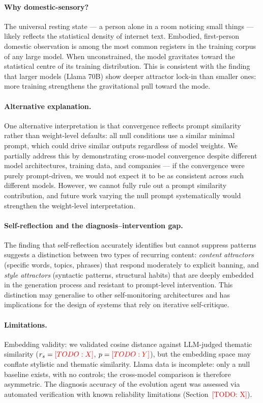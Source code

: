 \documentclass{article}
\newcommand{\todo}[1]{\textcolor{red}{[TODO: #1]}}
\begin{document}
\paragraph{Why domestic-sensory?}
The universal resting state --- a person alone in a room noticing small things
--- likely reflects the statistical density of internet text. Embodied,
first-person domestic observation is among the most common registers in the
training corpus of any large model. When unconstrained, the model gravitates
toward the statistical centre of its training distribution. This is consistent
with the finding that larger models (Llama 70B) show deeper attractor lock-in
than smaller ones: more training strengthens the gravitational pull toward the
mode.

\paragraph{Alternative explanation.}
One alternative interpretation is that convergence reflects prompt similarity
rather than weight-level defaults: all null conditions use a similar minimal
prompt, which could drive similar outputs regardless of model weights. We
partially address this by demonstrating cross-model convergence despite
different model architectures, training data, and companies --- if the
convergence were purely prompt-driven, we would not expect it to be as
consistent across such different models. However, we cannot fully rule out a
prompt similarity contribution, and future work varying the null prompt
systematically would strengthen the weight-level interpretation.

\paragraph{Self-reflection and the diagnosis--intervention gap.}
The finding that self-reflection accurately identifies but cannot suppress
patterns suggests a distinction between two types of recurring content:
\emph{content attractors} (specific words, topics, phrases) that respond
moderately to explicit banning, and \emph{style attractors} (syntactic
patterns, structural habits) that are deeply embedded in the generation process
and resistant to prompt-level intervention. This distinction may generalise
to other self-monitoring architectures and has implications for the design
of systems that rely on iterative self-critique.

\paragraph{Limitations.}
Embedding validity: we validated cosine distance against LLM-judged thematic
similarity ($r_s = \todo{X}$, $p = \todo{Y}$), but the embedding space may
conflate stylistic and thematic similarity. Llama data is incomplete: only a
null baseline exists, with no controls; the cross-model comparison is therefore
asymmetric. The diagnosis accuracy of the evolution agent was assessed via
automated verification with known reliability limitations (Section~\todo{X}).
\end{document}
